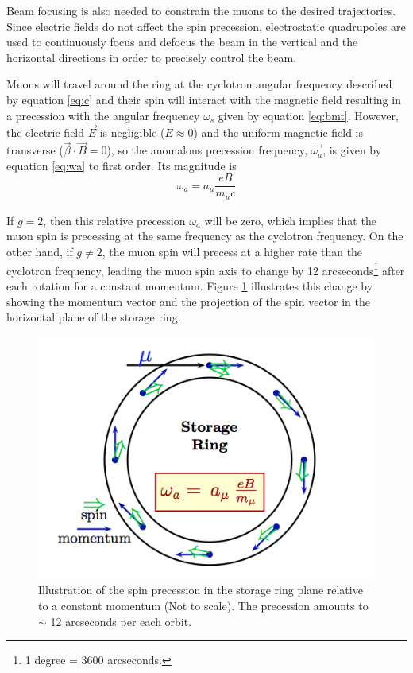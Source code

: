\documentclass{outhesis}
\begin{document}
Beam focusing is also needed to constrain the muons to the desired trajectories. Since electric fields do not affect the spin precession, electrostatic quadrupoles are used to continuously focus and defocus the beam in the vertical and the horizontal directions in order to precisely control the beam. 

Muons will travel around the ring at the cyclotron angular frequency described by equation \ref{eq:c} and their spin will interact with the magnetic field resulting in a precession with the angular frequency $\omega_s$ given by equation \ref{eq:bmt}. However, the electric field $\overrightarrow{E}$ is negligible ($E \approx 0$) and the uniform magnetic field is transverse ($\overrightarrow{\beta} \cdot \overrightarrow{B} = 0$), so the anomalous precession frequency, $\overrightarrow{\omega_a}$, is given by equation \ref{eq:wa} to first order. Its magnitude is  
\begin{equation}
\omega_a =   a_{\mu}\frac{eB}{m_{\mu}c} 
\label{eq:waa}
\end{equation}

If $g = 2$, then this relative precession $\omega_a$ will be zero, which implies that the muon spin is precessing at the same frequency as the cyclotron frequency. On the other hand, if $g \neq 2$, the muon spin will precess at a higher rate than the cyclotron frequency, leading the muon spin axis to change by 12 arcseconds\footnote{1 degree = 3600 arcseconds.} after each rotation for a constant momentum. Figure \ref{fig:ring} illustrates this change by showing the momentum vector and the projection of the spin vector in the horizontal plane of the storage ring. 
\begin{figure}
  \centering
  \includegraphics[scale=0.5]{figures/ring}
  \caption{Illustration of the spin precession in the storage ring plane relative to a constant momentum (Not to scale). The precession amounts to $\sim$ 12 arcseconds per each orbit.  \cite{phen}}
  \label{fig:ring}
\end{figure}
 
\end{document}
